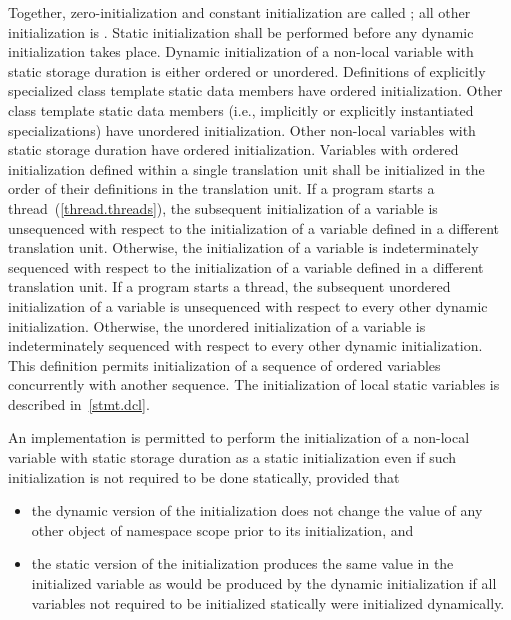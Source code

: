 Together, zero-initialization and constant initialization are called ; all other initialization is . Static
initialization shall be performed before any dynamic initialization takes place. Dynamic
initialization of a non-local variable with static storage duration is either ordered or
unordered. Definitions of explicitly specialized class template static data members have
ordered initialization. Other class template static data members (i.e., implicitly or
explicitly instantiated specializations) have unordered initialization. Other non-local
variables with static storage duration have ordered initialization. Variables with ordered
initialization defined within a single translation unit shall be initialized in the order of
their definitions in the translation unit. If a program starts a thread~(\ref{thread.threads}),
the subsequent initialization of a variable is unsequenced with respect to the initialization
of a variable defined in a different translation unit. Otherwise, the initialization of a
variable is indeterminately sequenced with respect to the initialization of a variable defined
in a different translation unit. If a program starts a thread, the subsequent unordered
initialization of a variable is unsequenced with respect to every other dynamic initialization.
Otherwise, the unordered initialization of a variable is indeterminately sequenced with respect
to every other dynamic initialization. \enternote This definition permits initialization of a
sequence of ordered variables concurrently with another sequence. \exitnote \enternote The
initialization of local static variables is described in~\ref{stmt.dcl}. \exitnote

\pnum
An implementation is permitted to perform the initialization of a
non-local variable with static storage duration as a static
initialization even if such initialization is not required to be done
statically, provided that

\begin{itemize}
\item
the dynamic version of the initialization does not change the
value of any other object of namespace scope prior to its initialization, and

\item
the static version of the initialization produces the same value
in the initialized variable as would be produced by the dynamic
initialization if all variables not required to be initialized statically
were initialized dynamically.
\end{itemize}

